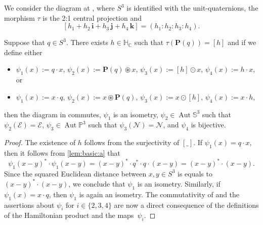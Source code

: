 \documentclass[11pt]{article}
\newenvironment{Mlist}{\begin{itemize}[topsep=0pt,itemsep=4pt,leftmargin=7mm]}{\end{itemize}}
\newcommand{\RL}[2]{\Cref{lem:#1}\ref{lem:#1:#2}}
\newcommand{\C}{\mathbb{C}}
\renewcommand{\P}{\mathbb{P}}
\renewcommand{\S}{\mathbb{S}}
\newcommand{\bP}{\mathbf{P}}
\newcommand{\cN}{\mathcal{N}}
\newcommand{\cE}{\mathcal{E}}
\newcommand{\HC}{\mathbb{H}_{\C}}
\newcommand{\qi}{\mathbf{i}}
\newcommand{\qj}{\mathbf{j}}
\newcommand{\qk}{\mathbf{k}}
\newcommand{\aut}{\operatorname{Aut}}
\newcommand{\st}{such that }
\begin{document}
\begin{proposition}
\label{prp:el}
We consider the diagram at ,
where $S^3$ is identified with the unit-quaternions,
the morphism $\tau$ is the 2:1 central projection
and
\[
[h_1+h_2\,\qi+h_3\,\qj+h_4\,\qk]=(h_1:h_2:h_3:h_4).
\]
%
\begin{table}[!ht]
\caption{See .}
\label{tab:el}
\centering
{}
\end{table}

Suppose that $q\in S^3$. There exists $h\in\HC$ \st $\tau(\bP(q))=[h]$
and if we define either
\begin{Mlist}
\item
$\psi_1(x):=q\cdot x$,\quad
$\psi_2(x):=\bP(q)\circledast x$,\quad
$\psi_3(x):=[h]\odot x$,\quad
$\psi_4(x):=h\cdot x$, or
\item
$\psi_1(x):=x\cdot q$,\quad
$\psi_2(x):=x\circledast\bP(q)$,\quad
$\psi_3(x):=x\odot[h]$,\quad
$\psi_4(x):=x\cdot h$,
\end{Mlist}
then the diagram in  commutes,
$\psi_1$ is an isometry,
$\psi_2\in\aut\S^3$ \st $\psi_2(\cE)=\cE$,
$\psi_3\in\aut\P^3$ \st $\psi_3(\cN)=\cN$, and
$\psi_4$ is bijective.
\end{proposition}

\begin{proof}
The existence of $h$ follows from the surjectivity of $[\_]$.
If $\psi_1(x)=q\cdot x$, then it follows from \RL{basic}{a} that
\[
\psi_1(x-y)^*\cdot\psi_1(x-y)=(x-y)^*\cdot q^*\cdot q\cdot(x-y)=(x-y)^*\cdot(x-y).
\]
Since the squared Euclidean distance between $x,y\in S^3$ is equals to $(x-y)^*\cdot(x-y)$,
we conclude that $\psi_1$ is an isometry.
Similarly, if $\psi_1(x)=x\cdot q$, then $\psi_1$ is again an isometry.
The commutativity of  and the assertions about $\psi_i$ for $i\in\{2,3,4\}$
are now a direct consequence of the definitions of
the Hamiltonian product and the maps~$\psi_i$.
\end{proof}
\end{document}
